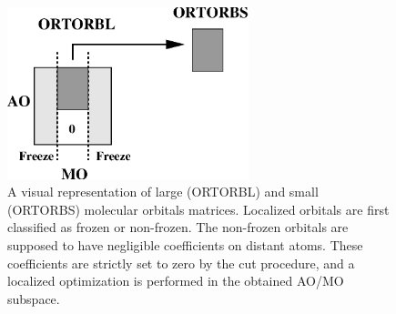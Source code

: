 \begin{figure}[ht]
\begin{center}
\includegraphics[width=7cm,keepaspectratio]{02_localization/images/matrix.eps}
\caption{\footnotesize A visual representation of large (ORTORBL) and small (ORTORBS)
molecular orbitals matrices. Localized orbitals are first classified as frozen or
non-frozen. The non-frozen orbitals are supposed to have negligible
coefficients on distant atoms. These coefficients are strictly set to
zero by the cut procedure, and a localized optimization is performed in the
obtained AO/MO subspace. }
\label{fig:matrix}
\end{center}
\end{figure}

